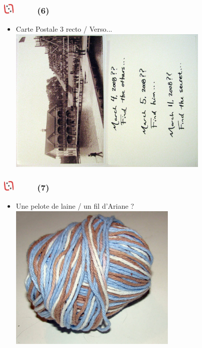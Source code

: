 \documentclass[slidetop,11pt]{beamer}
\def\moreInFrameTitleLeftt{\includegraphics[height=0.5cm]{img/ligueludique-0.png}~~~~~}
\begin{document}
\begin{frame}
	\frametitle{\moreInFrameTitleLeftt \sectionPartIIaIV  (6) }
	\begin{itemize}
		\item Carte Postale 3 recto / Verso...
		\includegraphics[height=7.00cm]{img/argTheLostRing/2298573497_9faf88fc1d_o.jpg}
	\end{itemize}
\end{frame} 

\begin{frame}
	\frametitle{\moreInFrameTitleLeftt \sectionPartIIaIV  (7) }
	\begin{itemize}
		\item Une pelote de laine / un fil d'Ariane ?
		\includegraphics[height=7.00cm]{img/argTheLostRing/2299401072_b1ddc63acc_o.jpg}
	\end{itemize}
\end{frame}
\end{document}
